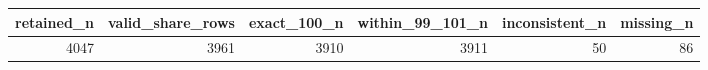 \begin{tabular}{rrrrrr}
\toprule
retained_n & valid_share_rows & exact_100_n & within_99_101_n & inconsistent_n & missing_n \\
\midrule
4047 & 3961 & 3910 & 3911 & 50 & 86 \\
\bottomrule
\end{tabular}
